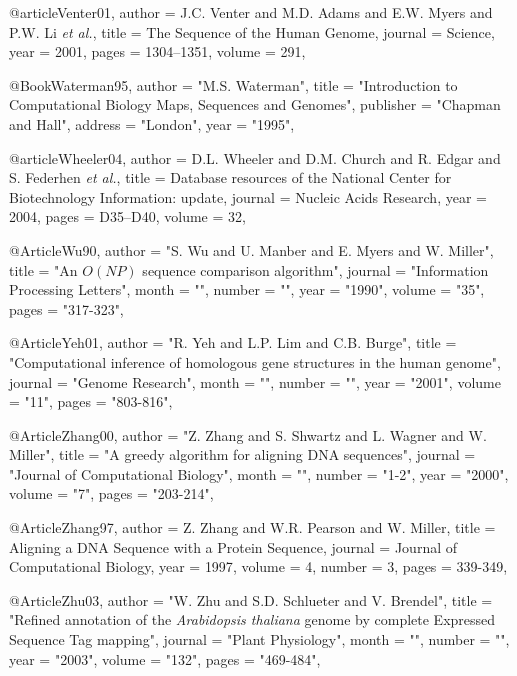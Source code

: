 @article{Venter01,
author = {J.C. Venter and M.D. Adams and E.W. Myers and P.W. Li {\it et al.}},
title = {The Sequence of the Human Genome},
journal = {Science},
year = 2001,
pages = {1304--1351},
volume = {291},
}

@Book{Waterman95,
  author =   "M.S. Waterman",
  title =    "Introduction to \uppercase{C}omputational \uppercase{B}iology
                  \uppercase{M}aps, \uppercase{S}equences and \uppercase{G}enomes",
  publisher =    "Chapman and Hall",
  address   =    "London",
  year =     "1995",
}



@article{Wheeler04,
author = {D.L. Wheeler and D.M. Church and R. Edgar  and S. Federhen {\it et al.}},
title = {Database resources of the {N}ational {C}enter for {B}iotechnology {I}nformation: update},
journal = {Nucleic Acids Research},
year = 2004,
pages = {D35--D40},
volume = {32},
}


@Article{Wu90,
   author =   "S. Wu and U. Manber and E. Myers and W. Miller",
   title =   "An $O(NP)$ sequence comparison algorithm",
   journal =   "Information Processing Letters",
   month = "",
   number = "",
   year =   "1990",
   volume =   "35",
   pages =   "317-323",
}


@Article{Yeh01,
   author =   "R. Yeh and L.P. Lim and C.B. Burge",
   title =   "Computational inference of homologous gene structures in the human genome",
   journal =   "Genome Research",
   month = "",
   number = "",
   year =   "2001",
   volume =   "11",
   pages =   "803-816",
}

@Article{Zhang00,
   author =   "Z. Zhang and S. Shwartz and L. Wagner and W. Miller",
   title =   "A greedy algorithm for aligning {DNA} sequences",
   journal =   "Journal of Computational Biology",
   month = "",
   number = "1-2",
   year =   "2000",
   volume =   "7",
   pages =   "203-214",
}

@Article{Zhang97,
  author =      {Z. Zhang and  W.R. Pearson and W. Miller},
  title =       {Aligning a {DNA} Sequence with a Protein Sequence},
  journal =     {Journal of Computational Biology},
  year =        {1997},
  volume =      {4},
  number =      {3},
  pages =       {339-349},
}


@Article{Zhu03,
   author =   "W. Zhu and S.D. Schlueter and V. Brendel",
   title =   "Refined annotation of the {\it \uppercase{A}rabidopsis thaliana} genome by complete {E}xpressed {S}equence {T}ag mapping",
   journal =   "Plant Physiology",
   month = "",
   number = "",
   year =   "2003",
   volume =   "132",
   pages =   "469-484",
}


